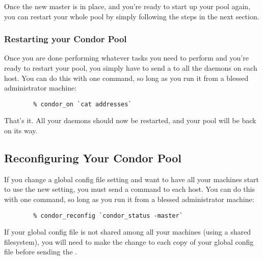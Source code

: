 Once the new master is in place, and you're ready to start up your
pool again, you can restart your whole pool by simply following the
steps in the next section.

\subsubsection{\label{sec:Pool-Restart}Restarting your Condor Pool}

Once you are done performing whatever tasks you need to perform and
you're ready to restart your pool, you simply have to send a
 to all the  daemons on each host.
You can do this with one command, so long as you run it from a blessed
administrator machine:
\begin{verbatim}
        % condor_on `cat addresses`
\end{verbatim}
That's it.  All your daemons should now be restarted, and your pool
will be back on its way.

\subsection{\label{sec:Reconfigure-Pool}Reconfiguring Your Condor Pool}

If you change a global config file setting and want to have all your
machines start to use the new setting, you must send a
 command to each host.
You can do this with one command, so long as you run it from a blessed
administrator machine:
\begin{verbatim}
        % condor_reconfig `condor_status -master`
\end{verbatim}

\Note If your global config file is not shared among all your machines
(using a shared filesystem), you will need to make the change to each
copy of your global config file before sending the .
